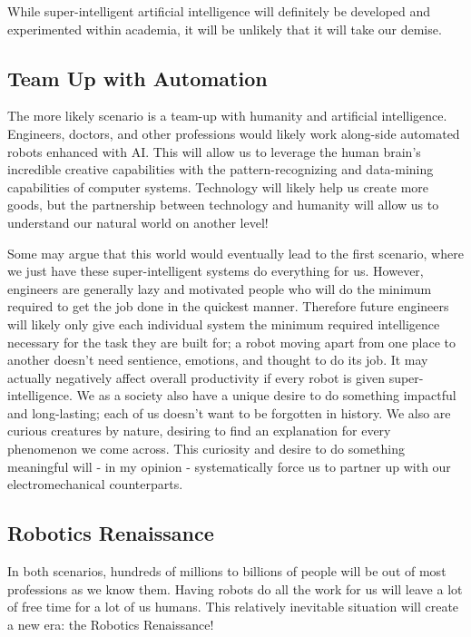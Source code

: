 While super-intelligent artificial intelligence will definitely be developed and experimented within academia, it will be unlikely that it will take our demise.

\subsection{Team Up with Automation}

The more likely scenario is a team-up with humanity and artificial intelligence. Engineers, doctors, and other professions would likely work along-side automated robots enhanced with AI. This will allow us to leverage the human brain's incredible creative capabilities with the pattern-recognizing and data-mining capabilities of computer systems. Technology will likely help us create more goods, but the partnership between technology and humanity will allow us to understand our natural world on another level!

Some may argue that this world would eventually lead to the first scenario, where we just have these super-intelligent systems do everything for us. However, engineers are generally lazy and motivated people who will do the minimum required to get the job done in the quickest manner. Therefore future engineers will likely only give each individual system the minimum required intelligence necessary for the task they are built for; a robot moving apart from one place to another doesn't need sentience, emotions, and thought to do its job. It may actually negatively affect overall productivity if every robot is given super-intelligence. We as a society also have a unique desire to do something impactful and long-lasting; each of us doesn't want to be forgotten in history. We also are curious creatures by nature, desiring to find an explanation for every phenomenon we come across. This curiosity and desire to do something meaningful will - in my opinion - systematically force us to partner up with our electromechanical counterparts.

\subsection{Robotics Renaissance}

In both scenarios, hundreds of millions to billions of people will be out of most professions as we know them. Having robots do all the work for us will leave a lot of free time for a lot of us humans. This relatively inevitable situation will create a new era: the Robotics Renaissance!

